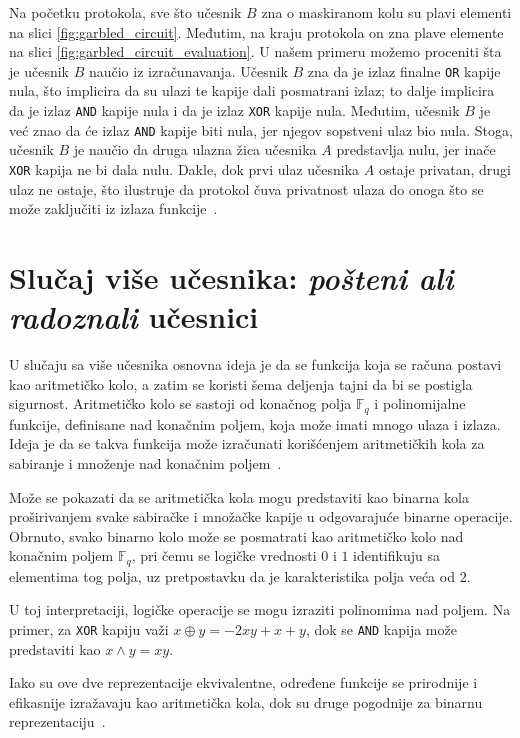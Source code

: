 Na početku protokola, sve što učesnik $B$ zna o maskiranom kolu su plavi elementi na slici \ref{fig:garbled_circuit}. Međutim, na kraju protokola on zna plave elemente na slici \ref{fig:garbled_circuit_evaluation}. U našem primeru možemo proceniti šta je učesnik $B$ naučio iz izračunavanja. Učesnik $B$ zna da je izlaz finalne \verb|OR| kapije nula, što implicira da su ulazi te kapije dali posmatrani izlaz; to dalje implicira da je izlaz \verb|AND| kapije nula i da je izlaz \verb|XOR| kapije nula. Međutim, učesnik $B$ je već znao da će izlaz \verb|AND| kapije biti nula, jer njegov sopstveni ulaz bio nula. Stoga, učesnik $B$ je naučio da druga ulazna žica učesnika $A$ predstavlja nulu, jer inače \verb|XOR| kapija ne bi dala nulu. Dakle, dok prvi ulaz učesnika $A$ ostaje privatan, drugi ulaz ne ostaje, što ilustruje da protokol čuva privatnost ulaza do onoga što se može zaključiti iz izlaza funkcije~\cite{smart2016cryptography}.


\section{Slučaj više učesnika: \emph{pošteni ali radoznali} učesnici}

U slučaju sa više učesnika osnovna ideja je da se funkcija koja se računa postavi kao aritmetičko kolo, a zatim se koristi šema deljenja tajni da bi se postigla sigurnost. Aritmetičko kolo se sastoji od konačnog polja $\mathbb{F}_q$ i polinomijalne funkcije, definisane nad konačnim poljem, koja može imati mnogo ulaza i izlaza. Ideja je da se takva funkcija može izračunati korišćenjem aritmetičkih kola za sabiranje i množenje nad konačnim poljem~\cite{smart2016cryptography}.

Može se pokazati da se aritmetička kola mogu predstaviti kao binarna kola proširivanjem svake sabiračke i množačke kapije u odgovarajuće binarne operacije. Obrnuto, svako binarno kolo može se posmatrati kao aritmetičko kolo nad konačnim poljem $\mathbb{F}_q$, pri čemu se logičke vrednosti $0$ i $1$ identifikuju sa elementima tog polja, uz pretpostavku da je karakteristika polja veća od $2$.

U toj interpretaciji, logičke operacije se mogu izraziti polinomima nad poljem. Na primer, za \verb|XOR| kapiju važi $x \oplus y = -2xy + x + y$, dok se \verb|AND| kapija može predstaviti kao $x \land y = xy$.

Iako su ove dve reprezentacije ekvivalentne, određene funkcije se prirodnije i efikasnije izražavaju kao aritmetička kola, dok su druge pogodnije za binarnu reprezentaciju~\cite{smart2016cryptography}.

